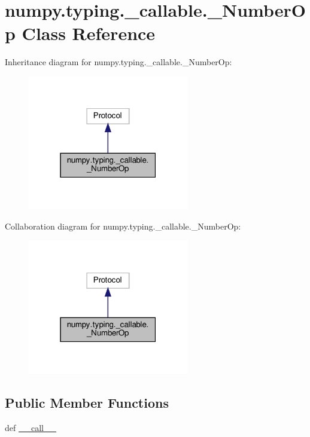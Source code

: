\hypertarget{classnumpy_1_1typing_1_1__callable_1_1__NumberOp}{}\section{numpy.\+typing.\+\_\+callable.\+\_\+\+Number\+Op Class Reference}
\label{classnumpy_1_1typing_1_1__callable_1_1__NumberOp}


Inheritance diagram for numpy.\+typing.\+\_\+callable.\+\_\+\+Number\+Op\+:
\nopagebreak
\begin{figure}[H]
\begin{center}
\leavevmode
\includegraphics[width=199pt]{classnumpy_1_1typing_1_1__callable_1_1__NumberOp__inherit__graph}
\end{center}
\end{figure}


Collaboration diagram for numpy.\+typing.\+\_\+callable.\+\_\+\+Number\+Op\+:
\nopagebreak
\begin{figure}[H]
\begin{center}
\leavevmode
\includegraphics[width=199pt]{classnumpy_1_1typing_1_1__callable_1_1__NumberOp__coll__graph}
\end{center}
\end{figure}
\subsection*{Public Member Functions}
\begin{DoxyCompactItemize}
\item 
def \hyperlink{classnumpy_1_1typing_1_1__callable_1_1__NumberOp_aa31d9b48f728b08cf4c1f0a38c9e399b}{\+\_\+\+\_\+call\+\_\+\+\_\+}
\end{DoxyCompactItemize}


